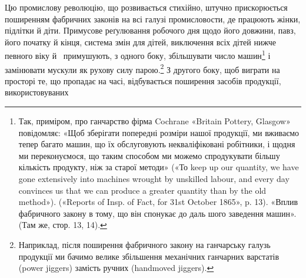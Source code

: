 Цю промислову революцію, що розвивається стихійно, штучно
прискорюється поширенням фабричних законів на всі галузі
промисловости, де працюють жінки, підлітки й діти. Примусове
реґулювання робочого дня щодо його довжини, павз, його початку
й кінця, система змін для дітей, виключення всіх дітей нижче
певного віку й~ примушують, з одного боку, збільшувати
число машин\footnote{
Так, приміром, про ганчарство фірма Cochrane «Britain Pottery,
Glasgow» повідомляє: «Щоб зберігати попередні розміри нашої продукції,
ми вживаємо тепер багато машин, що їх обслуговують некваліфіковані робітники,
і щодня ми переконуємося, що таким способом ми можемо спродукувати
більшу кількість продукту, ніж за старої методи» («То keep up
our quantity, we have gone extensively into machines wrought by unskilled
labour, and every day convinces us that we can produce a greater quantity
than by the old method»). («Reports of Insp. of Fact, for 31st October
1865», p. 13). «Вплив фабричного закону в тому, що він спонукає до даль
шого заведення машин». (Там же, стор. 13, 14).
} і замінювати мускули як рухову силу парою.\footnote{
Наприклад, після поширення фабричного закону на ганчарську
галузь продукції ми бачимо велике збільшення механічних ганчарних
варстатів (power jiggers) замість ручних (handmoved jiggers).
}
З другого боку, щоб виграти на просторі те, що пропадає на часі,
відбувається поширення засобів продукції, використовуваних
\parbreak{}  %
